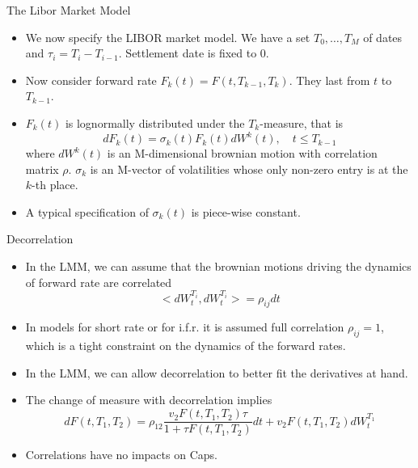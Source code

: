 \documentclass{beamer}
\begin{document}
\begin{frame}{The Libor Market Model}
	\begin{itemize}
		\item We now specify the LIBOR market model. We have a set $T_0,\ldots,T_M$ of dates and $\tau_i=T_i-T_{i-1}$. Settlement date is fixed to 0.
		\item Now consider forward rate $F_k(t)=F(t,T_{k-1},T_k)$. They last from $t$ to $T_{k-1}$.
		\item $F_k(t)$ is lognormally distributed under the $T_k$-measure, that is 
		\begin{equation}
			dF_k(t) = \sigma_k(t)F_k(t)dW^k(t),\quad t\leq T_{k-1}
		\end{equation} 
		where $dW^k(t)$ is an M-dimensional brownian motion with correlation matrix $\rho$. $\sigma_k$ is an M-vector of volatilities whose only non-zero entry is at the $k$-th place.
		\item A typical specification of $\sigma_k(t)$ is piece-wise constant.
	\end{itemize}
\end{frame}

\begin{frame}{Decorrelation}
	\begin{itemize}
		\item In the LMM, we can assume that the brownian motions driving the dynamics of forward rate are correlated
		\begin{equation}
			<dW_t^{T_i}, dW_t^{T_i}> = \rho_{ij}dt
		\end{equation}
		\item In models for short rate or for i.f.r. it is assumed full correlation $\rho_{ij}=1$, which is a tight constraint on the dynamics of the forward rates.
		\item In the LMM, we can allow decorrelation to better fit the derivatives at hand.
		\item The change of measure with decorrelation implies
		\begin{equation}
			dF(t,T_1,T_2)=\rho_{12}\frac{v_2F(t,T_1,T_2)\tau}{1+\tau F(t,T_1,T_2)}dt + v_2F(t,T_1,T_2)dW^{T_1}_t
		\end{equation}
		\item Correlations have no impacts on Caps.
	\end{itemize}
\end{frame}
\end{document}
